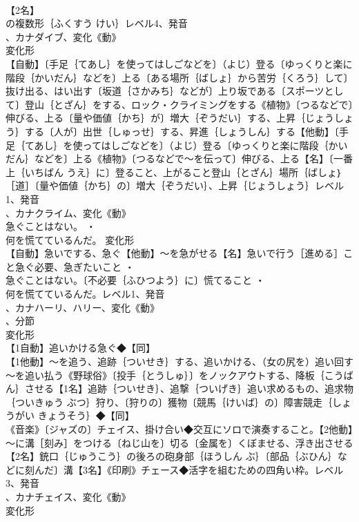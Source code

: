 \documentclass[8pt]{extreport}
\begin{document}
\begin{CJK}{UTF8}{min}
\\	【2名】
\\	の複数形｛ふくすう けい｝レベル4、発音
\\	、カナダイブ、変化《動》
\\	変化形 
\\	【自動】〔手足｛てあし｝を使ってはしごなどを〕（よじ）登る〔ゆっくりと楽に階段｛かいだん｝などを〕上る〔ある場所｛ばしょ｝から苦労｛くろう｝して〕抜け出る、はい出す〔坂道｛さかみち｝などが〕上り坂である〔スポーツとして〕登山｛とざん｝をする、ロック・クライミングをする《植物》〔つるなどで〕伸びる、上る〔量や価値｛かち｝が〕増大｛ぞうだい｝する、上昇｛じょうしょう｝する〔人が〕出世｛しゅっせ｝する、昇進｛しょうしん｝する【他動】〔手足｛てあし｝を使ってはしごなどを〕（よじ）登る〔ゆっくりと楽に階段｛かいだん｝などを〕上る《植物》〔つるなどで～を伝って〕伸びる、上る【名】〔一番上｛いちばん うえ｝に〕登ること、上がること登山｛とざん｝場所｛ばしょ｝［道］〔量や価値｛かち｝の〕増大｛ぞうだい｝、上昇｛じょうしょう｝レベル1、発音
\\	、カナクライム、変化《動》
\\	急ぐことはない。 ・
\\	何を慌てているんだ。	変化形 
\\	【自動】急いでする、急ぐ【他動】～を急がせる【名】急いで行う［進める］こと急ぐ必要、急ぎたいこと ・
\\	急ぐことはない。〔不必要｛ふひつよう｝に〕慌てること ・
\\	何を慌てているんだ。レベル1、発音
\\	、カナハーリ、ハリー、変化《動》
\\	、分節
\\	変化形 
\\	【1自動】追いかける急ぐ◆【同】
\\	【1他動】～を追う、追跡｛ついせき｝する、追いかける、（女の尻を）追い回す～を追い払う《野球俗》〔投手｛とうしゅ｝〕をノックアウトする、降板｛こうばん｝させる【1名】追跡｛ついせき｝、追撃｛ついげき｝追い求めるもの、追求物｛ついきゅう ぶつ｝狩り、〔狩りの〕獲物〔競馬｛けいば｝の〕障害競走｛しょうがい きょうそう｝◆【同】
\\	《音楽》〔ジャズの〕チェイス、掛け合い◆交互にソロで演奏すること。【2他動】～に溝［刻み］をつける〔ねじ山を〕切る〔金属を〕くぼませる、浮き出させる【2名】銃口｛じゅうこう｝の後ろの砲身部｛ほうしん ぶ｝〔部品｛ぶひん｝などに刻んだ〕溝【3名】《印刷》チェース◆活字を組むための四角い枠。レベル3、発音
\\	、カナチェイス、変化《動》
\\	変化形 

\end{CJK}
\end{document}
